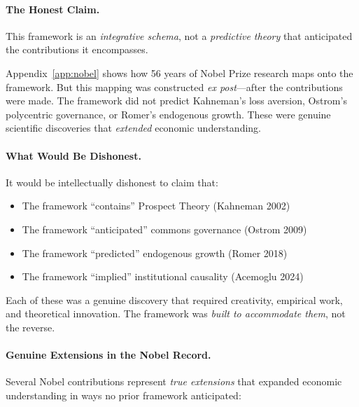 \documentclass[12pt,a4paper]{article}
\begin{document}
\paragraph{The Honest Claim.}
This framework is an \emph{integrative schema}, not a \emph{predictive theory}
that anticipated the contributions it encompasses.

Appendix~\ref{app:nobel} shows how 56 years of Nobel Prize research maps onto
the framework. But this mapping was constructed \emph{ex post}---after the
contributions were made. The framework did not predict Kahneman's loss aversion,
Ostrom's polycentric governance, or Romer's endogenous growth. These were
genuine scientific discoveries that \emph{extended} economic understanding.

\paragraph{What Would Be Dishonest.}
It would be intellectually dishonest to claim that:
\begin{itemize}
  \item The framework ``contains'' Prospect Theory (Kahneman 2002)
  \item The framework ``anticipated'' commons governance (Ostrom 2009)
  \item The framework ``predicted'' endogenous growth (Romer 2018)
  \item The framework ``implied'' institutional causality (Acemoglu 2024)
\end{itemize}

Each of these was a genuine discovery that required creativity, empirical work,
and theoretical innovation. The framework was \emph{built to accommodate them},
not the reverse.

\paragraph{Genuine Extensions in the Nobel Record.}
Several Nobel contributions represent \emph{true extensions} that expanded
economic understanding in ways no prior framework anticipated:
\end{document}

